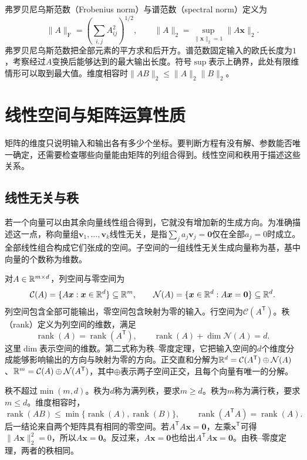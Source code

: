 弗罗贝尼乌斯范数（Frobenius norm）与谱范数（spectral norm）定义为
\begin{equation}
 \|A\|_{\mathrm F}=\left(\sum_{i,j}A_{ij}^2\right)^{1/2},\qquad
 \|A\|_2=\sup_{\|\bm x\|_2=1}\|A\bm x\|_2.
\end{equation}
弗罗贝尼乌斯范数把全部元素的平方求和后开方。谱范数固定输入的欧氏长度为$1$，考察经过$A$变换后能够达到的最大输出长度。符号$\sup$表示上确界，此处有限维情形可以取到最大值。维度相容时$\|AB\|_2\leq\|A\|_2\|B\|_2$。

\section{线性空间与矩阵运算性质}
矩阵的维度只说明输入和输出各有多少个坐标。要判断方程有没有解、参数能否唯一确定，还需要检查哪些向量能由矩阵的列组合得到。线性空间和秩用于描述这些关系。
\subsection{线性无关与秩}
若一个向量可以由其余向量线性组合得到，它就没有增加新的生成方向。为准确描述这一点，称向量组$\bm v_1,\ldots,\bm v_k$线性无关，是指$\sum_j a_j\bm v_j=\bm0$仅在全部$a_j=0$时成立。全部线性组合构成它们张成的空间。子空间的一组线性无关生成向量称为基，基中向量的个数称为维数。

对$A\in\mathbb{R}^{m\times d}$，列空间与零空间为
\begin{equation}
 \mathcal C(A)=\{A\bm x:\bm x\in\mathbb{R}^d\}\subseteq\mathbb{R}^m,\qquad
 \mathcal N(A)=\{\bm x\in\mathbb{R}^d:A\bm x=\bm0\}\subseteq\mathbb{R}^d.
\end{equation}
列空间包含全部可能输出，零空间包含映射为零的输入。行空间为$\mathcal C(A^{\mathsf T})$。秩（rank）定义为列空间的维数，满足
\begin{equation}
 \operatorname{rank}(A)=\operatorname{rank}(A^{\mathsf T}),\qquad
 \operatorname{rank}(A)+\dim\mathcal N(A)=d.
\end{equation}
这里$\dim$表示空间的维数。第二式称为秩--零度定理，它把输入空间的$d$个维度分成能够影响输出的方向与映射为零的方向。正交直和分解为$\mathbb{R}^d=\mathcal C(A^{\mathsf T})\oplus\mathcal N(A)$、$\mathbb{R}^m=\mathcal C(A)\oplus\mathcal N(A^{\mathsf T})$，其中$\oplus$表示两子空间正交，且每个向量有唯一的分解。

秩不超过$\min(m,d)$。秩为$d$称为满列秩，要求$m\geq d$。秩为$m$称为满行秩，要求$m\leq d$。维度相容时，
\begin{equation}
 \operatorname{rank}(AB)\leq\min\{\operatorname{rank}(A),\operatorname{rank}(B)\},\qquad
 \operatorname{rank}(A^{\mathsf T}A)=\operatorname{rank}(A).
\end{equation}
后一结论来自两个矩阵具有相同的零空间。若$A^{\mathsf T}A\bm x=\bm0$，左乘$\bm x^{\mathsf T}$可得$\|A\bm x\|_2^2=0$，所以$A\bm x=\bm0$。反过来，$A\bm x=\bm0$也给出$A^{\mathsf T}A\bm x=\bm0$。由秩--零度定理，两者的秩相同。

